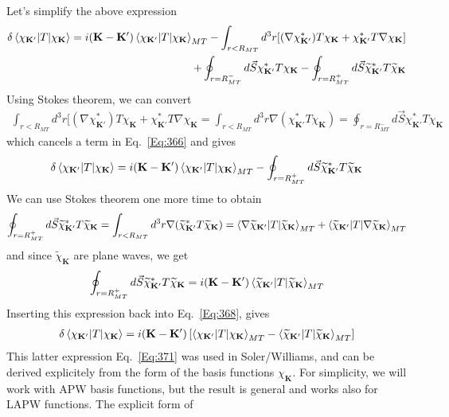 \documentclass[aps,prb,floatfix,epsfig,singlecolumn,showpacs,preprintnumbers]{revtex4}
\newcommand{\vK}{{\mathbf{K}}}
\begin{document}
Let's simplify the above expression
\begin{eqnarray}
\delta\braket{\chi_{\vK'}|T|\chi_{\vK}}=
i(\vK-\vK')\braket{\chi_{\vK'}|T|\chi_\vK}_{MT}
-\int_{r<R_{MT}}d^3r [(\nabla\chi^*_{\vK'}) T \chi_\vK+\chi_{\vK'}^* T \nabla\chi_{\vK}]\\
+\oint_{r=R_{MT}^-} d\vec{S}\chi^*_{\vK'} T \chi_{\vK}
-\oint_{r=R_{MT}^+} d\vec{S}\widetilde{\chi}^*_{\vK'} T \widetilde{\chi}_{\vK}
\label{Eq:366}
\end{eqnarray}
Using Stokes theorem, we can convert 
\begin{eqnarray}
\int_{r<R_{MT}}d^3r [(\nabla\chi^*_{\vK'}) T \chi_\vK+\chi_{\vK'}^* T  \nabla\chi_{\vK}=
\int_{r<R_{MT}}d^3r  \nabla (\chi^*_{\vK'}  T \chi_\vK) = \oint_{r=R_{MT}^-}d\vec{S}\chi^*_{\vK'}  T \chi_\vK
\end{eqnarray}
which cancels a term in Eq.~\ref{Eq:366} and gives
\begin{eqnarray}
\delta\braket{\chi_{\vK'}|T|\chi_{\vK}}=
i(\vK-\vK')\braket{\chi_{\vK'}|T|\chi_\vK}_{MT}
-\oint_{r=R_{MT}^+} d\vec{S}\widetilde{\chi}^*_{\vK'} T \widetilde{\chi}_{\vK}
\label{Eq:368}
\end{eqnarray}
We can use Stokes theorem one more time to obtain
\begin{eqnarray}
\oint_{r=R_{MT}^+} d\vec{S}\widetilde{\chi}^*_{\vK'} T  \widetilde{\chi}_{\vK}=
\int_{r<R_{MT}} d^3r \nabla (\widetilde{\chi}^*_{\vK'} T  \widetilde{\chi}_{\vK})=
\braket{\nabla\widetilde{\chi}_{\vK'} |T|\widetilde{\chi}_{\vK}}_{MT}+
\braket{\widetilde{\chi}_{\vK'} |T|\nabla\widetilde{\chi}_{\vK}}_{MT}
\end{eqnarray}
and since $\widetilde{\chi}_{\vK}$ are plane waves, we get
\begin{eqnarray}
\oint_{r=R_{MT}^+} d\vec{S}\widetilde{\chi}^*_{\vK'} T  \widetilde{\chi}_{\vK}=
i(\vK-\vK')\braket{\widetilde{\chi}_{\vK'} |T|\widetilde{\chi}_{\vK}}_{MT}
\end{eqnarray}
Inserting this expression back into Eq.~\ref{Eq:368}, gives
\begin{eqnarray}
\delta\braket{\chi_{\vK'}|T|\chi_{\vK}}=
i(\vK-\vK')\left[
\braket{\chi_{\vK'}|T|\chi_\vK}_{MT}-
\braket{\widetilde{\chi}_{\vK'} |T|\widetilde{\chi}_{\vK}}_{MT}
\right]
\label{Eq:371}
\end{eqnarray}
This latter expression Eq.~\ref{Eq:371} was used in Soler/Williams, and can be derived explicitely
from the form of the basis functions $\chi_{\vK}$.
For simplicity, we will work with APW basis functions, but the result
is general and works also for LAPW functions. The explicit form of
\end{document}
